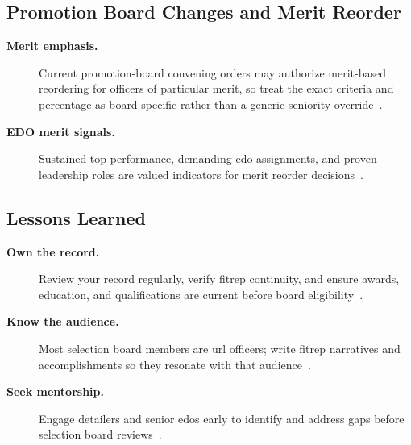 \documentclass[../main.tex]{subfiles}
\begin{document}
\subsection{Promotion Board Changes and Merit Reorder}
\begin{description}
  \item[\textbf{Merit emphasis.}] Current promotion-board convening orders may authorize merit-based reordering for officers of particular merit, so treat the exact criteria and percentage as board-specific rather than a generic seniority override~\autocite{edo-5-2-3-career-topics-2025,MyNavyHR-FY26-Staff-Convening-Order-Merit-Reorder}.
  \item[\textbf{EDO merit signals.}] Sustained top performance, demanding \ac{edo} assignments, and proven
  leadership roles are valued indicators for merit reorder decisions~\autocite{edo-5-2-3-career-topics-2025}.
\end{description}

\subsection{Lessons Learned}
\begin{description}
  \item[\textbf{Own the record.}] Review your record regularly, verify \ac{fitrep} continuity, and ensure awards,
  education, and qualifications are current before board eligibility~\autocite{edo-5-2-3-career-topics-2025}.
  \item[\textbf{Know the audience.}] Most selection board members are \ac{url} officers; write \ac{fitrep}
  narratives and accomplishments so they resonate with that audience~\autocite{edo-5-2-3-career-topics-2025}.
  \item[\textbf{Seek mentorship.}] Engage detailers and senior \acp{edo} early to identify and address gaps
  before selection board reviews~\autocite{edo-5-2-3-career-topics-2025}.
\end{description}
\end{document}
